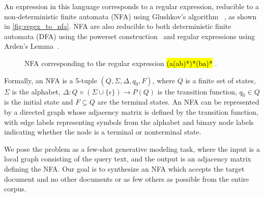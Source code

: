 \documentclass{article}
\newcommand{\tinline}[1]{%
    \begingroup%
    \sethlcolor{slightgray}%
    \hl{\ttfamily\footnotesize #1}%
    \endgroup
}
\begin{document}
An expression in this language corresponds to a regular expression, reducible to a non-deterministic finite automata (NFA) using Glushkov's algorithm ~\citep{glushkov1961abstract}, as shown in \autoref{fig:regex_to_nfa}. NFA are also reducible to both deterministic finite automata (DFA) using the powerset construction~\citep{rabin1959finite} and regular expressions using Arden's Lemma~\citep{arden1961delayed}.

\begin{figure}
    \caption{NFA corresponding to the regular expression \tinline{(a(ab)*)*(ba)*}.}
    \label{fig:regex_to_nfa}
\end{figure}

Formally, an NFA is a 5-tuple $(Q, \Sigma, \Delta, q_0, F)$, where $Q$ is a finite set of states, $\Sigma$ is the alphabet, $\Delta :Q\times (\Sigma \cup \{\epsilon \})\rightarrow P(Q)$ is the transition function, $q_0 \in Q$ is the initial state and $F \subseteq Q$ are the terminal states. An NFA can be represented by a directed graph whose adjacency matrix is defined by the transition function, with edge labels representing symbols from the alphabet and binary node labels indicating whether the node is a terminal or nonterminal state.

We pose the problem as a few-shot generative modeling task, where the input is a local graph consisting of the query text, and the output is an adjacency matrix defining the NFA. Our goal is to synthesize an NFA which accepts the target document and no other documents or as few others as possible from the entire corpus.
\end{document}
